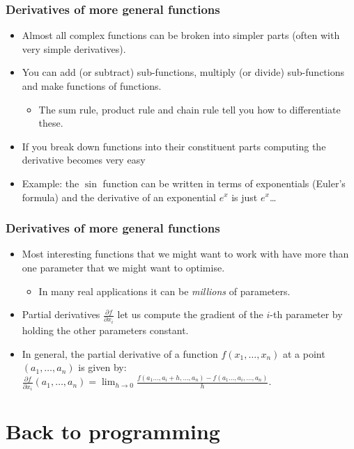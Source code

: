 \documentclass[\beamerclass]{beamer}
\begin{document}
\begin{frame}
\frametitle{Derivatives of more general functions}

\begin{itemize}
	\item<1-> Almost all complex functions can be broken into simpler parts (often with very simple derivatives).
	\item<1-> You can add (or subtract) sub-functions, multiply (or divide) sub-functions and make functions of functions.
	\begin{itemize}
		\item The sum rule, product rule and chain rule tell you how to differentiate these.
	\end{itemize}
	\item<2-> If you break down functions into their constituent parts computing the derivative becomes very easy
	\item<2-> Example: the $\sin$ function can be written in terms of exponentials (Euler's formula) and the derivative of an exponential $e^x$ is just $e^x$\dots
\end{itemize}
\end{frame}

\begin{frame}
\frametitle{Derivatives of more general functions}

\begin{itemize}
	\item<1-> Most interesting functions that we might want to work with have more than one parameter that we might want to optimise.
	\begin{itemize}
		\item<1-> In many real applications it can be \emph{millions} of parameters.
	\end{itemize}
	\item<2-> Partial derivatives $\frac{\partial f}{\partial x_i}$ let us compute the gradient of the $i$-th parameter by holding the other parameters constant.
	\item<3-> In general, the partial derivative of a function $f(x_1,\dots,x_n)$ at a point $(a_1,\dots,a_n)$ is given by: $\frac{\partial f}{\partial x_i}(a_1,\dots,a_n) = \lim_{h\to0}\frac{f(a_1\dots,a_i+h,\dots,a_n)-f(a_1\dots,a_i,\dots,a_n)}{h}$.
\end{itemize}
\end{frame}

\section{Back to programming}
\end{document}
